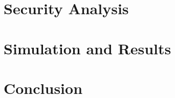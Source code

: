 \documentclass[letterpaper, 10 pt, conference]{ieeeconf}
\begin{document}
\section{Security Analysis}\label{sec:security}



% 
%                                 
%                                 
%                                 
% 
\section{Simulation and Results}\label{sec:simulation}


% 
%                                               
%                                               
%                                               
% 
\section{Conclusion}\label{sec:conclusion}





% 
%                                            
%                                            
%                                            
% 


\end{document}

